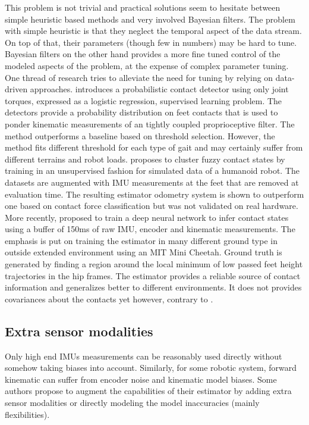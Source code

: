 This problem is not trivial and practical solutions seem to hesitate between simple heuristic based methods and very involved Bayesian filters. 
The problem with simple heuristic is that they neglect the temporal aspect of the data stream. On top of that, their parameters (though few in numbers) may be hard to tune.
Bayesian filters on the other hand provides a more fine tuned control of the modeled aspects of the problem, at the expense of complex parameter tuning.
One thread of research tries to alleviate the need for tuning by relying on data-driven approaches. \cite{camurri2017probabilistic} introduces a probabilistic 
contact detector using only joint torques, expressed as a logistic regression, supervised learning problem. The detectors provide a probability distribution 
on feet contacts that is used to ponder kinematic measurements of an tightly coupled proprioceptive filter. 
The method outperforms a baseline based on threshold selection. However, the method %
fits different threshold for each type of gait and may certainly suffer from different terrains and robot loads. 
\cite{rotella2018unsupervised} proposes to cluster fuzzy contact states by training in an unsupervised fashion for simulated data of a humanoid robot. The datasets are augmented
with IMU measurements at the feet that are removed at evaluation time. The resulting estimator odometry system is shown to outperform one based on contact force classification
but was not validated on real hardware. More recently, \cite{lin2021deep} proposed to train a deep neural network to infer contact states using a buffer of 150ms of raw IMU, 
encoder and kinematic measurements. The emphasis is put on training the estimator in many different ground type in outside extended environment using an MIT Mini Cheetah. Ground truth is generated
by finding a region around the local minimum of low passed feet height trajectories in the hip frames. The estimator provides a reliable source of contact information 
and generalizes better to different environments. It does not provides covariances about the contacts yet however, contrary to \cite{camurri2017probabilistic}.  



\subsection{Extra sensor modalities}
Only high end IMUs measurements can be reasonably used directly without somehow taking biases into account.
Similarly, for some robotic system, forward kinematic can suffer from encoder noise and kinematic model biases. Some authors propose to 
augment the capabilities of their estimator by adding extra sensor modalities or directly modeling the model inaccuracies (mainly flexibilities).

